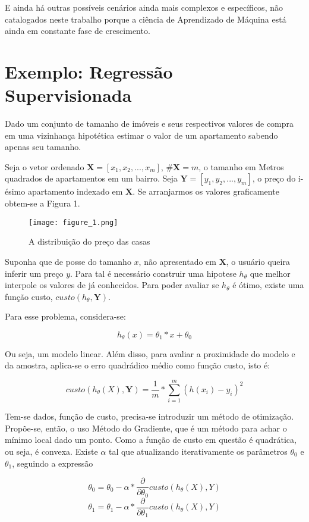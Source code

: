 E ainda há outras possíveis cenários ainda mais complexos e específicos, não catalogados neste trabalho porque a ciência de Aprendizado de Máquina está ainda em constante fase de crescimento.

\section{Exemplo: Regressão Supervisionada}

Dado um conjunto de tamanho de imóveis e seus respectivos valores de compra em uma vizinhança hipotética estimar o valor de um apartamento sabendo apenas seu tamanho.

Seja o vetor ordenado \(\mathbf{X} = [x_{1},x_{2},...,x_{m}]\), \(\#\mathbf{X} = m\), o tamanho em Metros quadrados de apartamentos em um bairro. Seja \(\mathbf{Y} = [y_{1},y_{2},...,y_{m}]\), o preço do i-ésimo apartamento indexado em \(\mathbf{X}\). Se arranjarmos os valores graficamente obtem-se a Figura 1.

\begin{figure}
	\centering
		\texttt{[image: figure\_1.png]}
		\caption{A distribuição do preço das casas}
		\label{casas}
\end{figure}

Suponha que de posse do tamanho \(x\), não apresentado em \(\mathbf{X}\), o usuário queira inferir um preço \(y\). Para tal é necessário construir uma hipotese \(h_{\theta}\) que melhor interpole os valores de já conhecidos. Para poder avaliar se \(h_{\theta}\) é ótimo, existe uma função custo, \(custo(h_{\theta},\mathbf{Y})\).

Para esse problema, considera-se:

\[h_{\theta}(x) = \theta_{1}*x + \theta_{0}\]

Ou seja, um modelo linear. Além disso, para avaliar a proximidade do modelo e da amostra, aplica-se o erro quadrádico médio como função custo, isto é:

\[custo(h_{\theta}(X),\mathbf{Y}) = \frac{1}{m}*\sum_{i=1}^{m}(h(x_{i})-y_{i})^2\]

Tem-se dados, função de custo, precisa-se introduzir um método de otimização. Propõe-se, então, o uso Método do Gradiente, que é um método para achar o mínimo local dado um ponto. Como a função de custo em questão é quadrática, ou seja, é convexa. Existe \(\alpha\) tal que atualizando iterativamente os parâmetros \(\theta_{0}\) e \(\theta_{1}\), seguindo a expressão

\[\theta_{0} = \theta_{0} - \alpha * \frac{\partial}{\partial \theta_{0}}  custo(h_{\theta}(X),Y)\]
\[\theta_{1} = \theta_{1} - \alpha * \frac{\partial}{\partial \theta_{1}}  custo(h_{\theta}(X),Y)\]

